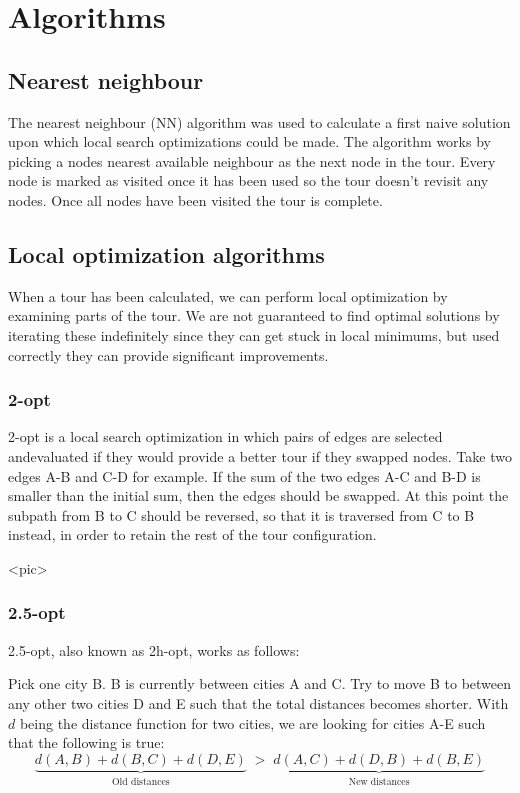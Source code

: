\documentclass[paper=a4, fontsize=11pt,numbers=endperiod]{scrartcl} %
\numberwithin{equation}{section} %
\numberwithin{figure}{section} %
\numberwithin{table}{section} %
\begin{document}
\section{Algorithms}

\subsection{Nearest neighbour}
The nearest neighbour (NN) algorithm was used to calculate a first naive solution upon which local search optimizations could be made.
The algorithm works by picking a nodes nearest available neighbour as the next node in the tour.
Every node is marked as visited once it has been used so the tour doesn't revisit any nodes.
Once all nodes have been visited the tour is complete.

\subsection{Local optimization algorithms}
When a tour has been calculated, we can perform local optimization by examining parts of the tour. We are not guaranteed to find optimal solutions by iterating these indefinitely since they can get stuck in local minimums, but used correctly they can provide significant improvements.

\subsubsection{2-opt}
2-opt is a local search optimization in which pairs of edges are selected andevaluated if they would provide a better tour if they swapped nodes.
Take two edges A-B and C-D for example.
If the sum of the two edges A-C and B-D is smaller than the initial sum, then the edges should be swapped.
At this point the subpath from B to C should be reversed, so that it is traversed from C to B instead, in order to retain the rest of the tour configuration.

<pic>

\subsubsection{2.5-opt}
2.5-opt, also known as 2h-opt, works as follows:

Pick one city B. B is currently between cities A and C. Try to move B to between any other two cities D and E such that the total distances becomes shorter. With $d$ being the distance function for two cities, we are looking for cities A-E such that the following is true:
\[
    \underbrace{d(A,B) + d(B,C) + d(D,E)}_\text{Old distances}\; > \;\underbrace{d(A,C) + d(D,B) + d(B,E)}_\text{New distances}
\]
\end{document}
